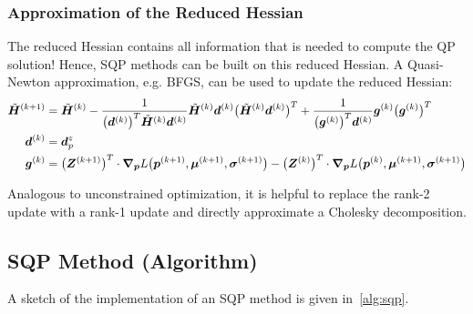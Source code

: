 			\subsubsection{Approximation of the Reduced Hessian}
				The reduced Hessian contains all information that is needed to compute the QP solution! Hence, SQP methods can be built on this reduced Hessian. A Quasi-Newton approximation, e.g. BFGS, can be used to update the reduced Hessian:
				\begin{align*}
					\tilde{\bm{H}}^{(k + 1)} &= \tilde{\bm{H}}^{(k)}
							- \frac{1}{\big(\bm{d}^{(k)}\big)^T \tilde{\bm{H}}^{(k)} \bm{d}^{(k)}} \tilde{\bm{H}}^{(k)} \bm{d}^{(k)} \big(\tilde{\bm{H}}^{(k)} \bm{d}^{(k)}\big)^T
							+ \frac{1}{\big(\bm{g}^{(k)}\big)^T \bm{d}^{(k)}} \bm{g}^{(k)} \big(\bm{g}^{(k)}\big)^T \\
					\bm{d}^{(k)} &= \bm{d}_p^z \\
					\bm{g}^{(k)} &= \big(\bm{Z}^{(k + 1)}\big)^T \cdot \grad_{\bm{p}}L\big(\bm{p}^{(k + 1)}, \bm{\mu}^{(k + 1)}, \bm{\sigma}^{(k + 1)}\big) - \big(\bm{Z}^{(k)}\big)^T \cdot \grad_{\bm{p}}L\big(\bm{p}^{(k)}, \bm{\mu}^{(k + 1)}, \bm{\sigma}^{(k + 1)}\big)
				\end{align*}

				Analogous to unconstrained optimization, it is helpful to replace the rank-2 update with a rank-1 update and directly approximate a Cholesky decomposition.

		\subsection{SQP Method (Algorithm)}
			A sketch of the implementation of an SQP method is given in~\autoref{alg:sqp}.

